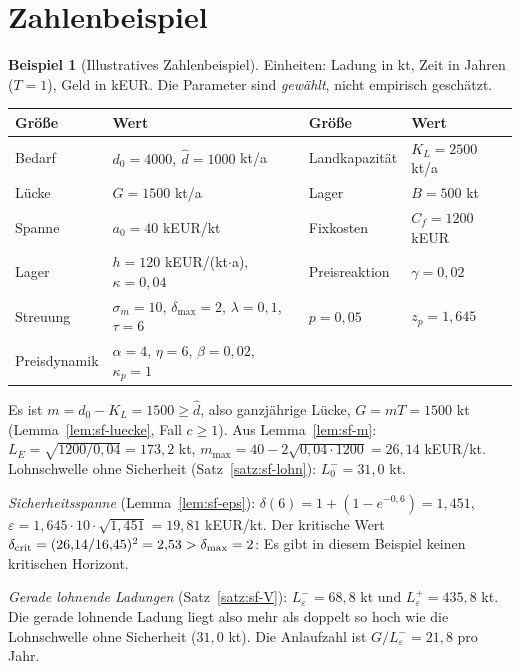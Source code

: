 \documentclass[a4paper, 12pt, twoside, openright]{report}
\providecommand{\dhat}{\hat d}      %
\theoremstyle{definition}
\theoremstyle{definition}
\newtheorem{beispiel}{Beispiel}[chapter]
\begin{document}
\section{Zahlenbeispiel}\label{sec:sf-bsp}

\begin{beispiel}[Illustratives Zahlenbeispiel]\label{bsp:sf-zahl}
Einheiten: Ladung in kt, Zeit in Jahren ($T=1$), Geld in kEUR. Die Parameter sind
\emph{gewählt}, nicht empirisch geschätzt.

\begin{center}
\begin{tabular}{@{}llll@{}}
\toprule
Größe & Wert & Größe & Wert\\
\midrule
Bedarf & $d_0=4000,\ \dhat=1000$ kt/a & Landkapazität & $K_L=2500$ kt/a\\
Lücke & $G=1500$ kt/a & Lager & $B=500$ kt\\
Spanne & $a_0=40$ kEUR/kt & Fixkosten & $C_f=1200$ kEUR\\
Lager & $h=120$ kEUR/(kt$\cdot$a), $\kappa=0{,}04$ & Preisreaktion & $\gamma=0{,}02$\\
Streuung & $\sigma_m=10$, $\delta_{\max}=2$, $\lambda=0{,}1$, $\tau=6$ & $p=0{,}05$ & $z_p=1{,}645$\\
Preisdynamik & $\alpha=4$, $\eta=6$, $\beta=0{,}02$, $\kappa_p=1$ & & \\
\bottomrule
\end{tabular}
\end{center}

Es ist $m=d_0-K_L=1500\ge\dhat$, also ganzjährige Lücke, $G=mT=1500$ kt
(Lemma~\ref{lem:sf-luecke}, Fall $c\ge1$). Aus Lemma~\ref{lem:sf-m}:
$L_E=\sqrt{1200/0{,}04}=173{,}2$ kt, $m_{\max}=40-2\sqrt{0{,}04\cdot1200}=26{,}14$ kEUR/kt.
Lohnschwelle ohne Sicherheit (Satz~\ref{satz:sf-lohn}): $L_0^-=31{,}0$ kt.

\emph{Sicherheitsspanne} (Lemma~\ref{lem:sf-eps}): $\delta(6)=1+(1-e^{-0{,}6})=1{,}451$,
$\varepsilon=1{,}645\cdot10\cdot\sqrt{1{,}451}=19{,}81$ kEUR/kt. Der kritische Wert
$\delta_{\rm crit}=(26{,}14/16{,}45)^2=2{,}53>\delta_{\max}=2$: Es gibt in diesem Beispiel
keinen kritischen Horizont.

\emph{Gerade lohnende Ladungen} (Satz~\ref{satz:sf-V}):
$L_\varepsilon^-=68{,}8$ kt und $L_\varepsilon^+=435{,}8$ kt. Die gerade lohnende
Ladung liegt also mehr als doppelt so hoch wie die Lohnschwelle ohne Sicherheit
($31{,}0$ kt). Die Anlaufzahl ist $G/L_\varepsilon^-=21{,}8$ pro Jahr.


\end{beispiel}
\end{document}
